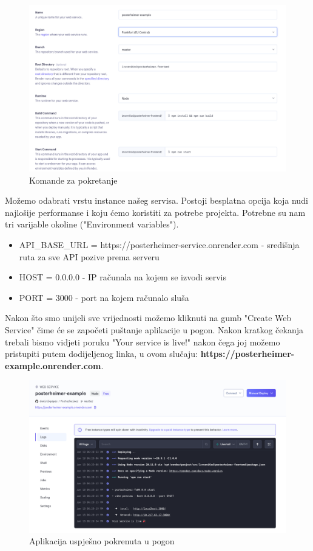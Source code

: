 			\begin{figure} [H]
				\includegraphics[width=\linewidth]{Slike/Run-Commands}
				\caption{Komande za pokretanje}
			\end{figure}
			
			Možemo odabrati vrstu instance našeg servisa. Postoji besplatna opcija koja nudi najlošije performanse i koju ćemo koristiti za potrebe projekta. Potrebne su nam tri varijable okoline ("Environment variables").
			
			\begin{itemize}
				\item  API\_BASE\_URL = https://posterheimer-service.onrender.com - središnja ruta za sve API pozive prema serveru
				\item HOST = 0.0.0.0 - IP računala na kojem se izvodi servis
				\item  PORT = 3000 - port na kojem računalo sluša
			\end{itemize}
			
			Nakon što smo unijeli sve vrijednosti možemo kliknuti na gumb "Create Web Service" čime će se započeti puštanje aplikacije u pogon. Nakon kratkog čekanja trebali bismo vidjeti poruku "Your service is live!" nakon čega joj možemo pristupiti putem dodijeljenog linka, u ovom slučaju: \textbf{https://posterheimer-example.onrender.com}.
			
			\begin{figure} [H]
				\includegraphics[width=\linewidth]{Slike/Frontend-Deployed}
				\caption{Aplikacija uspješno pokrenuta u pogon}
			\end{figure}
			\eject 